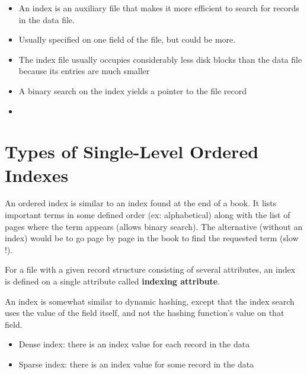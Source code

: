 \begin{itemize}
    \item An index is an auxiliary file that makes it more efficient to search for records in the data file.
    \item Usually specified on one field of the file, but could be more.
    \item The index file usually occupies considerably less disk blocks than the data file because its entries are much smaller
    \item A binary search on the index yields a pointer to the file record
    \item 
\end{itemize}

\section{Types of Single-Level Ordered Indexes}

An ordered index is similar to an index found at the end of a book. It lists important terms in some defined order (ex: alphabetical) along with the list of pages where the term appears (allows binary search). The alternative (without an index) would be to go page by page in the book to find the requested term (slow !).

For a file with a given record structure consisting of several attributes, an index is defined on a single attribute called \textbf{indexing attribute}.

An index is somewhat similar to dynamic hashing, except that the index search uses the value of the field itself, and not the hashing function's value on that field.

\begin{itemize}
    \item Dense index: there is an index value for each record in the data
    \item Sparse index: there is an index value for some record in the data
\end{itemize}


